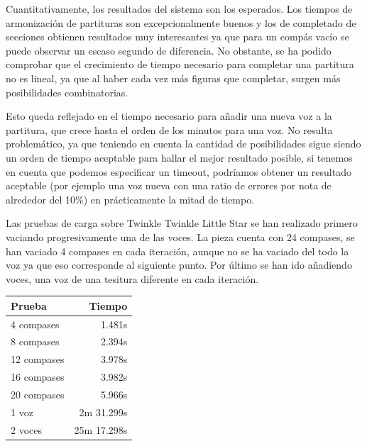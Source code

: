 Cuantitativamente, los resultados del sistema son los esperados. Los tiempos de armonización de partituras son excepcionalmente buenos y los de completado de secciones obtienen resultados muy interesantes ya que para un compás vacío se puede observar un escaso segundo de diferencia. No obstante, se ha podido comprobar que el crecimiento de tiempo necesario para completar una partitura no es lineal, ya que al haber cada vez más figuras que completar, surgen más posibilidades combinatorias.

Esto queda reflejado en el tiempo necesario para añadir una nueva voz a la partitura, que crece hasta el orden de los minutos para una voz. No resulta problemático, ya que teniendo en cuenta la cantidad de posibilidades sigue siendo un orden de tiempo aceptable para hallar el mejor resultado posible, si tenemos en cuenta que podemos especificar un timeout, podríamos obtener un resultado aceptable (por ejemplo una voz nueva con una ratio de errores por nota de alrededor del 10\%) en prácticamente la mitad de tiempo.

Las pruebas de carga sobre Twinkle Twinkle Little Star se han realizado primero vaciando progresivamente una de las voces. La pieza cuenta con 24 compases, se han vaciado 4 compases en cada iteración, aunque no se ha vaciado del todo la voz ya que eso corresponde al siguiente punto. Por último se han ido añadiendo voces, una voz de una tesitura diferente en cada iteración.
\begin{center}
	\begin{tabular}{ | l | r | }
		\hline
		Prueba & Tiempo \\ \hline
		4 compases  & 1.481s \\ \hline
		8 compases 	& 2.394s \\ \hline
		12 compases	& 3.978s \\ \hline
		16 compases & 3.982s \\ \hline
		20 compases & 5.966s \\ \hline
		1 voz & 2m 31.299s \\ \hline
		2 voces & 25m 17.298s  \\ \hline
	\end{tabular}
\end{center}

